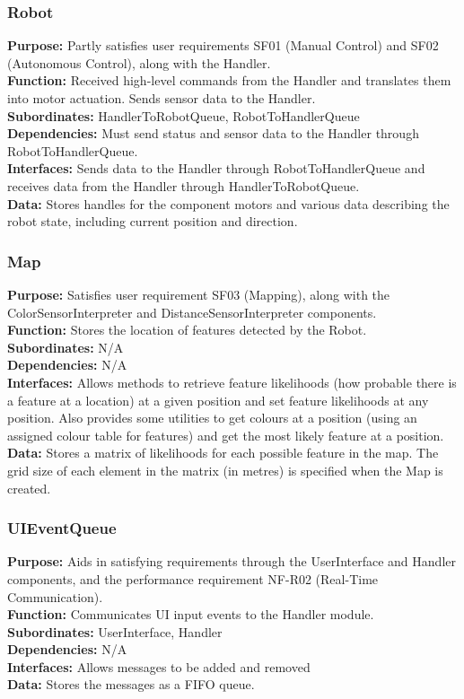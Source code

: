 \documentclass[12pt,a4paper]{article}
\begin{document}
\subsubsection{Robot}
	\textbf{Purpose:} Partly satisfies user requirements SF01 (Manual Control) and SF02 (Autonomous Control), along with the Handler.\\
	\textbf{Function:} Received high-level commands from the Handler and translates them into motor actuation. Sends sensor data to the Handler.\\
	\textbf{Subordinates:} HandlerToRobotQueue, RobotToHandlerQueue\\
	\textbf{Dependencies:} Must send status and sensor data to the Handler through RobotToHandlerQueue.\\
	\textbf{Interfaces:} Sends data to the Handler through RobotToHandlerQueue and receives data from the Handler through HandlerToRobotQueue.\\
    \textbf{Data:} Stores handles for the component motors and various data describing the robot state, including current position and direction.\\

\subsubsection{Map}
	\textbf{Purpose:} Satisfies user requirement SF03 (Mapping), along with the ColorSensorInterpreter and DistanceSensorInterpreter components.\\
	\textbf{Function:} Stores the location of features detected by the Robot.\\
	\textbf{Subordinates:} N/A\\
	\textbf{Dependencies:} N/A\\
	\textbf{Interfaces:} Allows methods to retrieve feature likelihoods (how probable there is a feature at a location) at a given position and set feature likelihoods at any position. Also provides some utilities to get colours at a position (using an assigned colour table for features) and get the most likely feature at a position.\\
    \textbf{Data:} Stores a matrix of likelihoods for each possible feature in the map. The grid size of each element in the matrix (in metres) is specified when the Map is created.\\

\subsubsection{UIEventQueue}
	\textbf{Purpose:} Aids in satisfying requirements through the UserInterface and Handler components, and the performance requirement NF-R02 (Real-Time Communication).\\
	\textbf{Function:} Communicates UI input events to the Handler module.\\
	\textbf{Subordinates:} UserInterface, Handler\\
	\textbf{Dependencies:} N/A\\
	\textbf{Interfaces:} Allows messages to be added and removed\\
    \textbf{Data:} Stores the messages as a FIFO queue.\\
    
\end{document}
